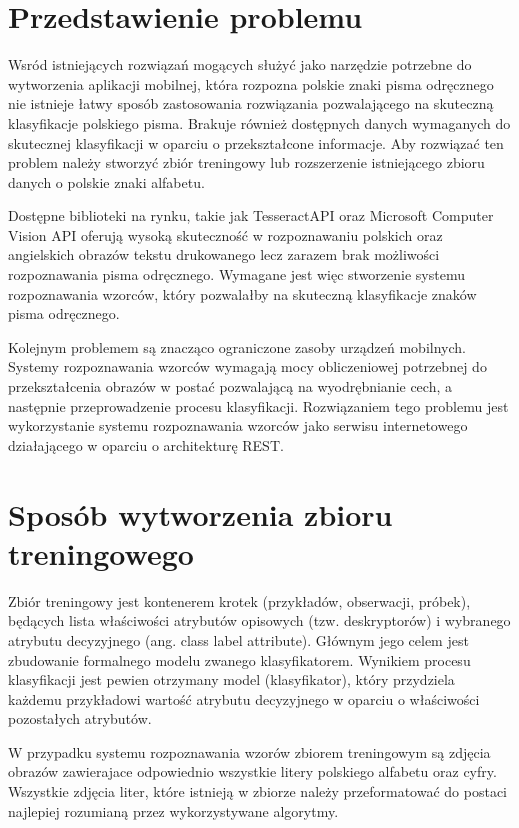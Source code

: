 \documentclass[brudnopis]{xmgr}
\begin{document}
\section{Przedstawienie problemu}

Wsród istniejących rozwiązań mogących służyć jako narzędzie potrzebne do wytworzenia aplikacji mobilnej, która rozpozna polskie znaki pisma odręcznego nie istnieje łatwy sposób zastosowania rozwiązania pozwalającego na skuteczną klasyfikacje polskiego pisma. Brakuje również dostępnych danych wymaganych do skutecznej klasyfikacji w oparciu o przekształcone informacje. Aby rozwiązać ten problem należy stworzyć zbiór treningowy lub rozszerzenie istniejącego zbioru danych o polskie znaki alfabetu.

Dostępne biblioteki na rynku, takie jak TesseractAPI oraz Microsoft Computer Vision API oferują wysoką skuteczność w rozpoznawaniu polskich oraz angielskich obrazów tekstu drukowanego lecz zarazem brak możliwości rozpoznawania pisma odręcznego. Wymagane jest więc stworzenie systemu rozpoznawania wzorców, który pozwalałby na skuteczną klasyfikacje znaków pisma odręcznego.

Kolejnym problemem są znacząco ograniczone zasoby urządzeń mobilnych. Systemy rozpoznawania wzorców wymagają mocy obliczeniowej potrzebnej do przekształcenia obrazów w postać pozwalającą na wyodrębnianie cech, a następnie przeprowadzenie procesu klasyfikacji. Rozwiązaniem tego problemu jest wykorzystanie systemu rozpoznawania wzorców jako serwisu internetowego działającego w oparciu o architekturę REST.

\section{Sposób wytworzenia zbioru treningowego}

Zbiór treningowy jest kontenerem krotek (przykładów, obserwacji, próbek), będących lista właściwości atrybutów opisowych (tzw. deskryptorów) i wybranego atrybutu decyzyjnego (ang. class label attribute). Głównym jego celem jest zbudowanie formalnego modelu zwanego klasyfikatorem. Wynikiem procesu klasyfikacji jest pewien otrzymany model (klasyfikator), który przydziela każdemu przykładowi wartość atrybutu decyzyjnego w oparciu o właściwości pozostałych atrybutów.

W przypadku systemu rozpoznawania wzorów zbiorem treningowym są zdjęcia obrazów zawierajace odpowiednio wszystkie litery polskiego alfabetu oraz cyfry. Wszystkie zdjęcia liter, które istnieją w zbiorze należy przeformatować do postaci najlepiej rozumianą przez wykorzystywane algorytmy.
\end{document}

